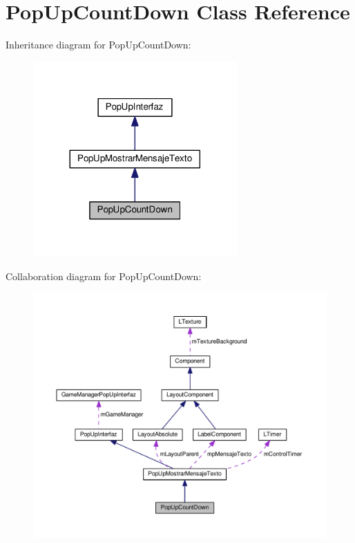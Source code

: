 \hypertarget{class_pop_up_count_down}{}\section{Pop\+Up\+Count\+Down Class Reference}
\label{class_pop_up_count_down}


Inheritance diagram for Pop\+Up\+Count\+Down\+:\nopagebreak
\begin{figure}[H]
\begin{center}
\leavevmode
\includegraphics[width=221pt]{class_pop_up_count_down__inherit__graph}
\end{center}
\end{figure}


Collaboration diagram for Pop\+Up\+Count\+Down\+:
\nopagebreak
\begin{figure}[H]
\begin{center}
\leavevmode
\includegraphics[width=350pt]{class_pop_up_count_down__coll__graph}
\end{center}
\end{figure}
